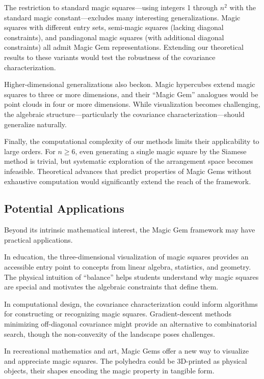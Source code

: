 The restriction to standard magic squares---using integers 1 through $n^2$ with the standard magic constant---excludes
many interesting generalizations.
Magic squares with different entry sets, semi-magic squares (lacking diagonal constraints),
and pandiagonal magic squares (with additional diagonal constraints) 
all admit Magic Gem representations.
Extending our theoretical results to these variants would test the robustness of the covariance characterization.

Higher-dimensional generalizations also beckon.
Magic hypercubes extend magic squares to three or more dimensions,
and their ``Magic Gem'' analogues would be point clouds in four or more dimensions.
While visualization becomes challenging, the algebraic structure---particularly the covariance characterization---should 
generalize naturally.

Finally, the computational complexity of our methods limits their applicability to large orders.
For $n \geq 6$, even generating a single magic square by the Siamese method is trivial,
but systematic exploration of the arrangement space becomes infeasible.
Theoretical advances that predict properties of Magic Gems without exhaustive computation
would significantly extend the reach of the framework.

\subsection{Potential Applications}

Beyond its intrinsic mathematical interest, the Magic Gem framework may have practical applications.

In education, the three-dimensional visualization of magic squares
provides an accessible entry point to concepts from linear algebra, statistics, and geometry.
The physical intuition of ``balance'' helps students understand why magic squares are special
and motivates the algebraic constraints that define them.

In computational design, the covariance characterization could inform algorithms
for constructing or recognizing magic squares.
Gradient-descent methods minimizing off-diagonal covariance might provide 
an alternative to combinatorial search, though the non-convexity of the landscape poses challenges.

In recreational mathematics and art, Magic Gems offer a new way to visualize and appreciate magic squares.
The polyhedra could be 3D-printed as physical objects, 
their shapes encoding the magic property in tangible form.

